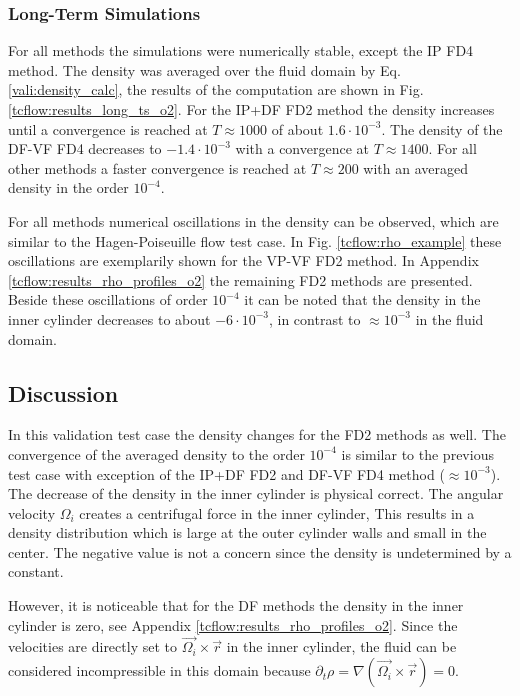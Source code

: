 \clearpage

\subsubsection{Long-Term Simulations}

For all methods the simulations were numerically stable, except the IP FD4 method.
The density was averaged over the fluid domain by Eq. \ref{vali:density_calc},
the results of the computation are shown in Fig. \ref{tcflow:results_long_ts_o2}.
For the IP+DF FD2 method the density increases until a convergence is reached at $T\approx 1000$ of about $1.6\cdot10^{-3}$.
The density of the  DF-VF FD4 decreases to $-1.4\cdot10^{-3}$ with a convergence at $T\approx1400$.
For all other methods a faster convergence is reached at $T\approx200$ with an  averaged density in the order $10^{-4}$.

For all methods numerical oscillations in the density can be
observed, which  are similar to the Hagen-Poiseuille flow test case.
In Fig. \ref{tcflow:rho_example} these oscillations are exemplarily shown for the VP-VF FD2 method.
In Appendix \ref{tcflow:results_rho_profiles_o2} the remaining FD2 methods are presented.
Beside these oscillations of order $10^{-4}$ it can be noted that the density in the inner cylinder
decreases to about $-6\cdot10^{-3}$, in contrast to $\approx10^{-3}$ in the fluid domain.

\subsection{Discussion}

In this validation test case the density changes for the FD2 methods as well.
The convergence of the averaged density to the order $10^{-4}$
is similar to the previous test case with exception of the IP+DF FD2 and DF-VF FD4 method ($\approx10^{-3}$).
The decrease of the density in the inner cylinder is physical correct.
The angular velocity $\Omega_i$ creates a centrifugal force in the inner cylinder,
This results in a density distribution which is large at the outer cylinder walls and small in the center.
The negative value is not a concern since the density is undetermined by a constant.

However, it is noticeable that for the DF methods the density in the inner cylinder is zero, see Appendix \ref{tcflow:results_rho_profiles_o2}.
Since the velocities are directly set to $\vec{\Omega_i} \times \vec{r}$ in the inner cylinder,
the fluid can be considered incompressible in this domain because $\partial_t \rho = \nabla (\vec{\Omega_i} \times \vec{r}) = 0$.

